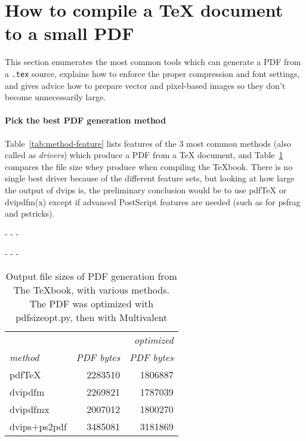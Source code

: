 \documentclass{ltugproc}
\def\cmd{\textsf}
\def\pkg{\textsf}
\def\captiontop#1{%
  \advance\abovecaptionskip-\belowcaptionskip
  \advance\belowcaptionskip\abovecaptionskip
  \advance\abovecaptionskip-\belowcaptionskip
  \abovecaptionskip-\abovecaptionskip
  \caption{#1}%
  \advance\abovecaptionskip-\belowcaptionskip
  \advance\belowcaptionskip\abovecaptionskip
  \advance\abovecaptionskip-\belowcaptionskip
  \abovecaptionskip-\abovecaptionskip
}
\begin{document}
\section{How to compile a \TeX{} document to a small PDF}\label{tex-to-pdf}

This section enumerates the most common tools which can generate a PDF from
a \texttt{.tex} source, explains how to enforce the proper compression and
font settings, and gives advice how to prepare vector and pixel-based images
so they don't become unnecessarily large.

\paragraph{Pick the best PDF generation method}
Table~\ref{tab:method-feature} lists features of the 3 most common methods
(also called as \emph{drivers}) which produce a PDF from a \TeX{} document,
and Table~\ref{tab:texbook-to-pdf} compares the file size whey produce when
compiling the \TeX{}book. There is no single best driver because of the
different feature sets, but looking at how large the output of \cmd{dvips}
is, the preliminary conclusion would be to use pdf\TeX{}
or \cmd{dvipdfm(x)} except if advanced PostScript features are needed (such
as for \pkg{psfrag} and \pkg{pstricks}).

\begin{table}
\captiontop{Output file sizes of PDF generation from The \TeX{}book, with
various methods. The PDF was optimized with \cmd{pdfsizeopt.py}, then with
Multivalent}\label{tab:texbook-to-pdf}
\par\small\noindent\hfil
\begin{tabular}{@{}lrr@{}}
\toprule
                  &&\emph{optimized}\\
\emph{method}     &\emph{PDF bytes}&\emph{PDF bytes}\\\midrule
pdf\TeX           &2283510 &1806887\\
\cmd{dvipdfm}     &2269821 &1787039\\
\cmd{dvipdfmx}    &2007012 &1800270\\
\cmd{dvips}$+$\cmd{ps2pdf}      &3485081 &3181869\\
\bottomrule
\end{tabular}
\end{table}
\end{document}
